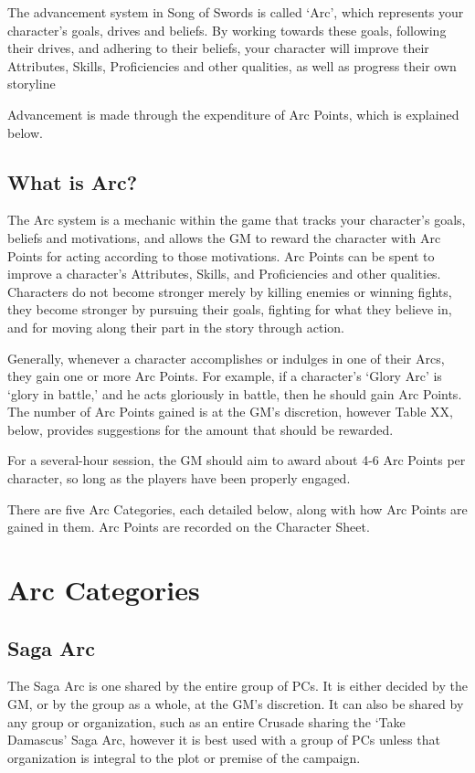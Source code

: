 \documentclass[oneside,11pt,english]{book}
\begin{document}
The advancement system in Song of Swords is called ‘Arc’, which represents your character’s goals, 
drives and beliefs. By working towards these goals, following their drives, and adhering to their beliefs, 
your character will improve their Attributes, Skills, Proficiencies and other qualities, as well as progress their own storyline 

Advancement is made through the expenditure of Arc Points, which is explained below. 

 
\subsection*{What is Arc?}
The Arc system is a mechanic within the game that tracks your character’s goals, beliefs and motivations, 
and allows the GM to reward the character with Arc Points for acting according to those motivations. Arc 
Points can be spent to improve a character’s Attributes, Skills, and Proficiencies and other qualities. 
Characters do not become stronger merely by killing enemies or winning fights, they become stronger by 
pursuing their goals, fighting for what they believe in, and for moving along their part in the story through 
action. 

 
Generally, whenever a character accomplishes or indulges in one of their Arcs, they gain one or more Arc 
Points. For example, if a character’s ‘Glory Arc’ is ‘glory in battle,’ and he acts gloriously in battle, then 
he should gain Arc Points. The number of Arc Points gained is at the GM’s discretion, however Table 
XX, below, provides suggestions for the amount that should be rewarded. 

 
For a several-hour session, the GM should aim to award about 4-6 Arc Points per character, so long as the 
players have been properly engaged. 
 

There are five Arc Categories, each detailed below, along with how Arc Points are gained in them. Arc 
Points are recorded on the Character Sheet. 
\section{Arc Categories}

\subsection{Saga Arc}
The Saga Arc is one shared by the entire group of PCs. It is either decided by the GM, or by the group as 
a whole, at the GM’s discretion. It can also be shared by any group or organization, such as an entire 
Crusade sharing the ‘Take Damascus’ Saga Arc, however it is best used with a group of PCs unless that 
organization is integral to the plot or premise of the campaign. 
 
\end{document}
